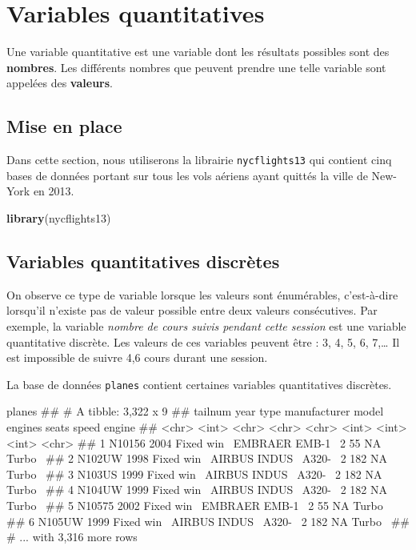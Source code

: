 \documentclass[]{book}
\newenvironment{Shaded}{\begin{snugshade}}{\end{snugshade}}
\newcommand{\KeywordTok}[1]{\textcolor[rgb]{0.13,0.29,0.53}{\textbf{#1}}}
\newcommand{\NormalTok}[1]{#1}
\theoremstyle{definition}
\theoremstyle{definition}
\theoremstyle{definition}
\theoremstyle{remark}
\begin{document}
\hypertarget{variables-quantitatives}{%
\section{Variables quantitatives}\label{variables-quantitatives}}

Une variable quantitative est une variable dont les résultats possibles
sont des \textbf{nombres}. Les différents nombres que peuvent prendre
une telle variable sont appelées des \textbf{valeurs}.

\hypertarget{mise-en-place-1}{%
\subsection{Mise en place}\label{mise-en-place-1}}

Dans cette section, nous utiliserons la librairie \texttt{nycflights13}
qui contient cinq bases de données portant sur tous les vols aériens
ayant quittés la ville de New-York en 2013.

\begin{Shaded}
\begin{Highlighting}[]
\KeywordTok{library}\NormalTok{(nycflights13)}
\end{Highlighting}
\end{Shaded}

\hypertarget{variables-quantitatives-discretes}{%
\subsection{Variables quantitatives
discrètes}\label{variables-quantitatives-discretes}}

On observe ce type de variable lorsque les valeurs sont énumérables,
c'est-à-dire lorsqu'il n'existe pas de valeur possible entre deux
valeurs consécutives. Par exemple, la variable \emph{nombre de cours
suivis pendant cette session} est une variable quantitative discrète.
Les valeurs de ces variables peuvent être : 3, 4, 5, 6, 7,\ldots{} Il
est impossible de suivre 4,6 cours durant une session.

La base de données \texttt{planes} contient certaines variables
quantitatives discrètes.

\begin{Shaded}
\begin{Highlighting}[]
\NormalTok{planes}
\NormalTok{## # A tibble: 3,322 x 9}
\NormalTok{##   tailnum  year type       manufacturer  model  engines seats speed engine}
\NormalTok{##   <chr>   <int> <chr>      <chr>         <chr>    <int> <int> <int> <chr> }
\NormalTok{## 1 N10156   2004 Fixed win~ EMBRAER       EMB-1~       2    55    NA Turbo~}
\NormalTok{## 2 N102UW   1998 Fixed win~ AIRBUS INDUS~ A320-~       2   182    NA Turbo~}
\NormalTok{## 3 N103US   1999 Fixed win~ AIRBUS INDUS~ A320-~       2   182    NA Turbo~}
\NormalTok{## 4 N104UW   1999 Fixed win~ AIRBUS INDUS~ A320-~       2   182    NA Turbo~}
\NormalTok{## 5 N10575   2002 Fixed win~ EMBRAER       EMB-1~       2    55    NA Turbo~}
\NormalTok{## 6 N105UW   1999 Fixed win~ AIRBUS INDUS~ A320-~       2   182    NA Turbo~}
\NormalTok{## # ... with 3,316 more rows}
\end{Highlighting}
\end{Shaded}
\end{document}
